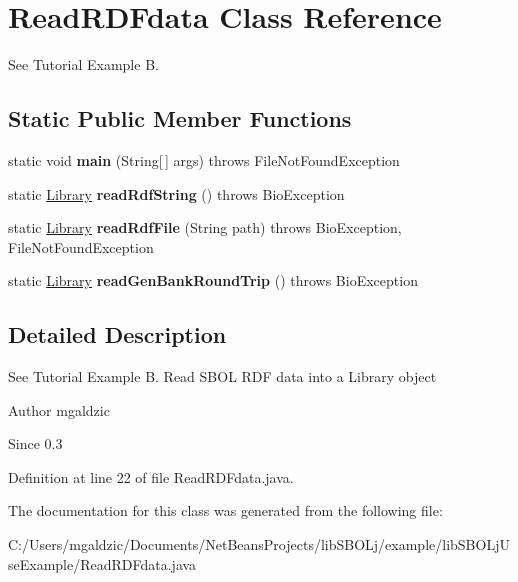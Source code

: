 \hypertarget{classlib_s_b_o_lj_use_example_1_1_read_r_d_fdata}{
\section{ReadRDFdata Class Reference}
\label{classlib_s_b_o_lj_use_example_1_1_read_r_d_fdata}
}


See Tutorial Example B.  


\subsection*{Static Public Member Functions}
\begin{DoxyCompactItemize}
\item 
\hypertarget{classlib_s_b_o_lj_use_example_1_1_read_r_d_fdata_a8b260eecbaabcef8473fd87ada040682}{
static void {\bfseries main} (String\mbox{[}$\,$\mbox{]} args)  throws FileNotFoundException }
\label{classlib_s_b_o_lj_use_example_1_1_read_r_d_fdata_a8b260eecbaabcef8473fd87ada040682}

\item 
\hypertarget{classlib_s_b_o_lj_use_example_1_1_read_r_d_fdata_a896b40c90ccdb283966879af0f41f8ac}{
static \hyperlink{classorg_1_1sbolstandard_1_1lib_s_b_o_lj_1_1_library}{Library} {\bfseries readRdfString} ()  throws BioException}
\label{classlib_s_b_o_lj_use_example_1_1_read_r_d_fdata_a896b40c90ccdb283966879af0f41f8ac}

\item 
\hypertarget{classlib_s_b_o_lj_use_example_1_1_read_r_d_fdata_a665bdf49c68647cafea9efd2a05b40d6}{
static \hyperlink{classorg_1_1sbolstandard_1_1lib_s_b_o_lj_1_1_library}{Library} {\bfseries readRdfFile} (String path)  throws BioException, FileNotFoundException}
\label{classlib_s_b_o_lj_use_example_1_1_read_r_d_fdata_a665bdf49c68647cafea9efd2a05b40d6}

\item 
\hypertarget{classlib_s_b_o_lj_use_example_1_1_read_r_d_fdata_a75a7971d04d124974bcdae98ecb74c7c}{
static \hyperlink{classorg_1_1sbolstandard_1_1lib_s_b_o_lj_1_1_library}{Library} {\bfseries readGenBankRoundTrip} ()  throws BioException}
\label{classlib_s_b_o_lj_use_example_1_1_read_r_d_fdata_a75a7971d04d124974bcdae98ecb74c7c}

\end{DoxyCompactItemize}


\subsection{Detailed Description}
See Tutorial Example B. Read SBOL RDF data into a Library object \begin{DoxyAuthor}{Author}
mgaldzic 
\end{DoxyAuthor}
\begin{DoxySince}{Since}
0.3 
\end{DoxySince}


Definition at line 22 of file ReadRDFdata.java.



The documentation for this class was generated from the following file:\begin{DoxyCompactItemize}
\item 
C:/Users/mgaldzic/Documents/NetBeansProjects/libSBOLj/example/libSBOLjUseExample/ReadRDFdata.java\end{DoxyCompactItemize}
